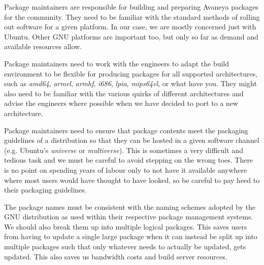 
Package maintainers are responsible for building and preparing Avaneya packages for the community. They need to be familiar with the standard methods of rolling out software for a given platform. In our case, we are mostly concerned just with Ubuntu. Other GNU platforms are important too, but only so far as demand and available resources allow.

Package maintainers need to work with the engineers to adapt the build environment to be flexible for producing packages for all supported architectures, such as {\it amd64}, {\it armel}, {\it armhf}, {\it i686}, {\it lpia}, {\it mips64el}, or what have you. They might also need to be familiar with the various quirks of different architectures and advise the engineers where possible when we have decided to port to a new architecture.

Package maintainers need to ensure that package contents meet the packaging guidelines of a distribution so that they can be hosted in a given software channel (e.g. Ubuntu's {\it universe} or {\it multiverse}). This is sometimes a very difficult and tedious task and we must be careful to avoid stepping on the wrong toes. There is no point on spending years of labour only to not have it available anywhere where most users would have thought to have looked, so be careful to pay heed to their packaging guidelines.

The package names must be consistent with the naming schemes adopted by the GNU distribution as used within their respective package management systems. We should also break them up into multiple logical packages. This saves users from having to update a single large package when it can instead be split up into multiple packages such that only whatever needs to actually be updated, gets updated. This also saves us bandwidth costs and build server resources.



\StopChapter

